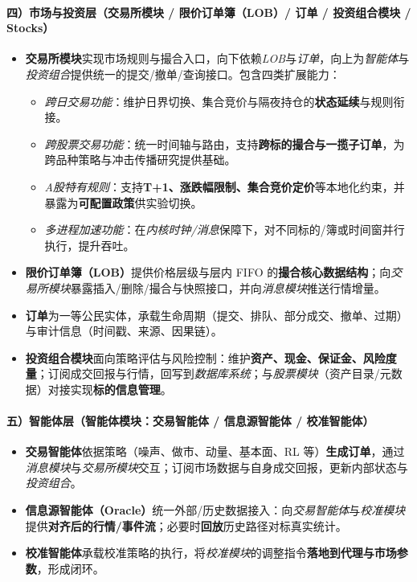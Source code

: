 \documentclass{mancls}
\begin{document}
\paragraph{四）市场与投资层（交易所模块 / 限价订单簿（LOB）/ 订单 / 投资组合模块 / Stocks）}
\begin{itemize}
  \item \textbf{交易所模块}实现市场规则与撮合入口，向下依赖\emph{LOB}与\emph{订单}，向上为\emph{智能体}与\emph{投资组合}提供统一的提交/撤单/查询接口。包含四类扩展能力：
    \begin{itemize}
      \item \emph{跨日交易功能}：维护日界切换、集合竞价与隔夜持仓的\textbf{状态延续}与规则衔接。
      \item \emph{跨股票交易功能}：统一时间轴与路由，支持\textbf{跨标的撮合与一揽子订单}，为跨品种策略与冲击传播研究提供基础。
      \item \emph{A股特有规则}：支持\textbf{T+1、涨跌幅限制、集合竞价定价}等本地化约束，并暴露为\textbf{可配置政策}供实验切换。
      \item \emph{多进程加速功能}：在\emph{内核时钟/消息}保障下，对不同标的/簿或时间窗并行执行，提升吞吐。
    \end{itemize}
  \item \textbf{限价订单簿（LOB）}提供价格层级与层内 FIFO 的\textbf{撮合核心数据结构}；向\emph{交易所模块}暴露插入/删除/撮合与快照接口，并向\emph{消息模块}推送行情增量。
  \item \textbf{订单}为一等公民实体，承载生命周期（提交、排队、部分成交、撤单、过期）与审计信息（时间戳、来源、因果链）。
  \item \textbf{投资组合模块}面向策略评估与风险控制：维护\textbf{资产、现金、保证金、风险度量}；订阅成交回报与行情，回写到\emph{数据库系统}；与\emph{股票模块}（资产目录/元数据）对接实现\textbf{标的信息管理}。
\end{itemize}

\paragraph{五）智能体层（智能体模块：交易智能体 / 信息源智能体 / 校准智能体）}
\begin{itemize}
  \item \textbf{交易智能体}依据策略（噪声、做市、动量、基本面、RL 等）\textbf{生成订单}，通过\emph{消息模块}与\emph{交易所模块}交互；订阅市场数据与自身成交回报，更新内部状态与\emph{投资组合}。
  \item \textbf{信息源智能体（Oracle）}统一外部/历史数据接入：向\emph{交易智能体}与\emph{校准模块}提供\textbf{对齐后的行情/事件流}；必要时\textbf{回放}历史路径对标真实统计。
  \item \textbf{校准智能体}承载校准策略的执行，将\emph{校准模块}的调整指令\textbf{落地到代理与市场参数}，形成闭环。
\end{itemize}
\end{document}
